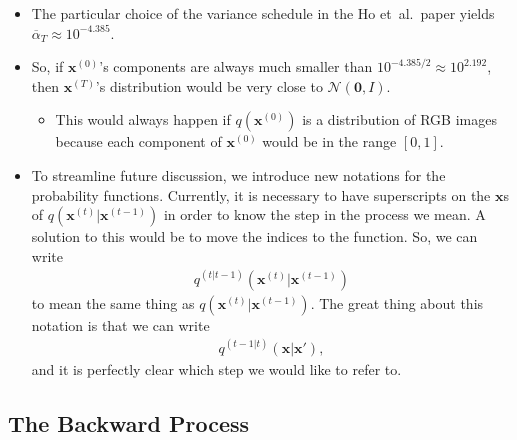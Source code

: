 \documentclass[10pt]{article}
\newcommand{\ve}[1]{\mathbf{#1}}
\newcommand{\etal}{{et~al.}}
\newcommand{\mcal}[1]{\mathcal{#1}}
\begin{document}
\begin{itemize}
  \item The particular choice of the variance schedule in the Ho \etal\ paper yields $\overline{\alpha}_T \approx 10^{-4.385}$. 
  
  \item So, if $\ve{x}^{(0)}$'s components are always much smaller than $10^{-4.385 / 2} \approx 10^{2.192}$, then $\ve{x}^{(T)}$'s distribution would be very close to $\mcal{N}(\ve{0}, I)$.
  \begin{itemize}
    \item This would always happen if $q(\ve{x}^{(0)})$ is a distribution of RGB images because each component of $\ve{x}^{(0)}$ would be in the range $[0,1]$.
  \end{itemize}

  \item To streamline future discussion, we introduce new notations for the probability functions. Currently, it is necessary to have superscripts on the $\ve{x}$s of $q(\ve{x}^{(t)}|\ve{x}^{(t-1)})$ in order to know the step in the process we mean. A solution to this would be to move the indices to the function. So, we can write
  \begin{align*}
    q^{(t|t-1)}(\ve{x}^{(t)}|\ve{x}^{(t-1)})
  \end{align*}
  to mean the same thing as $q(\ve{x}^{(t)}|\ve{x}^{(t-1)})$. The great thing about this notation is that we can write
  \begin{align*}
    q^{(t-1|t)}(\ve{x}|\ve{x}'),
  \end{align*}
  and it is perfectly clear which step we would like to refer to.
\end{itemize}

\subsection{The Backward Process}
\end{document}
